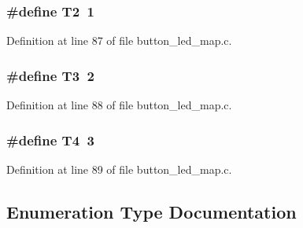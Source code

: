 \subsubsection[{T2}]{\setlength{\rightskip}{0pt plus 5cm}\#define T2~1}\label{button__led__map_8c_a259c2993ee45e06a4ea8150451a7a70e}


Definition at line 87 of file button\-\_\-led\-\_\-map.\-c.

\subsubsection[{T3}]{\setlength{\rightskip}{0pt plus 5cm}\#define T3~2}\label{button__led__map_8c_a5d800c5f04f8638061876b9e32c6c508}


Definition at line 88 of file button\-\_\-led\-\_\-map.\-c.

\subsubsection[{T4}]{\setlength{\rightskip}{0pt plus 5cm}\#define T4~3}\label{button__led__map_8c_a935a699e9bf1bffc5dad8738d3cd24c0}


Definition at line 89 of file button\-\_\-led\-\_\-map.\-c.



\subsection{Enumeration Type Documentation}
